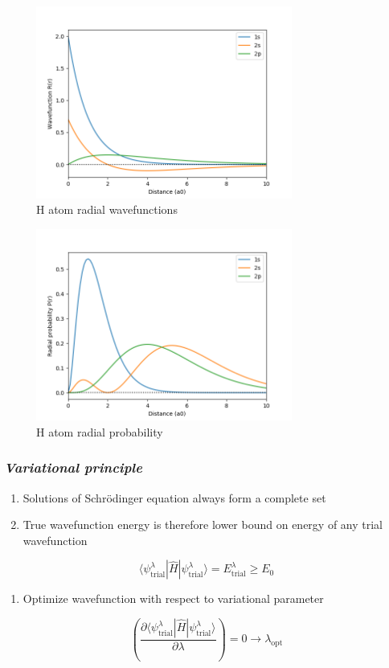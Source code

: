\documentclass[11pt]{article}
\begin{document}
\begin{figure}[htbp]
\centering
\includegraphics[width=0.75\textwidth]{./Images/H-R.png}
\caption{H atom radial wavefunctions}
\end{figure} 
\begin{figure}[htbp]
\centering
\includegraphics[width=0.75\textwidth]{./Images/H-P.png}
\caption{H atom radial probability}
\end{figure} 

\subsubsection{\emph{Variational principle}}
\label{sec:org421ae04}
\begin{enumerate}
\item Solutions of Schr\"{o}dinger equation always form a complete set
\item True wavefunction energy is therefore lower bound on energy of any trial wavefunction
\end{enumerate}
\[\langle \psi_\text{trial}^\lambda | \hat{H} | \psi_\text{trial}^\lambda\rangle =E_\text{trial}^\lambda \geq E_0\]
\begin{enumerate}
\item Optimize wavefunction with respect to variational parameter
\end{enumerate}
\[ \left ( \frac{\partial \langle \psi_\text{trial}^\lambda | \hat{H} | \psi_\text{trial}^\lambda\rangle}{\partial\lambda} \right ) = 0 \rightarrow \lambda_\text{opt} \] 
\end{document}
